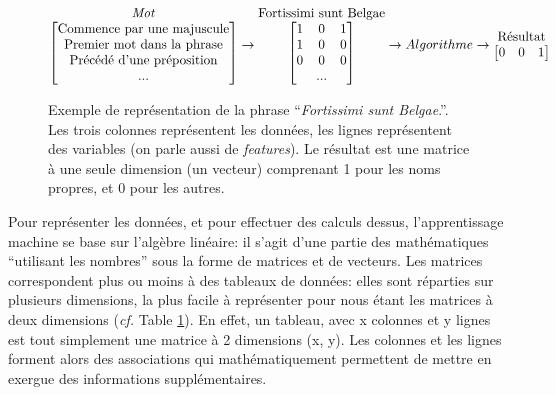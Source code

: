 \begin{figure}[h]
    \centering
    \begin{equation*}
        \begin{matrix}
            \textrm{\textit{Mot}} \\
            \begin{bmatrix}
            \textrm{Commence par une majuscule} \\
            \textrm{Premier mot dans la phrase} \\
            \textrm{Précédé d'une préposition} \\
            \textrm{...} \\
            \end{bmatrix}
        \end{matrix}
        \rightarrow
        \begin{matrix}
            \textrm{Fortissimi sunt Belgae} \\
            \begin{bmatrix}
            1 & 0 & 1 \\
            1 & 0 & 0 \\
            0 & 0 & 0 \\
            & \textrm{...} & \\
            \end{bmatrix}
        \end{matrix}
        \rightarrow Algorithme \rightarrow
        \begin{matrix}
            \textrm{Résultat} \\
            \begin{bmatrix}
            0 & 0 & 1 \\
            \end{bmatrix}
        \end{matrix}
        \end{equation*}
    \caption{Exemple de représentation de la phrase \enquote{\textit{Fortissimi sunt Belgae}.}. Les trois colonnes représentent les données, les lignes représentent des variables (on parle aussi de \textit{features}). Le résultat est une matrice à une seule dimension (un vecteur) comprenant 1 pour les noms propres, et 0 pour les autres.}
    \label{fig:deep-learning:matrice}
\end{figure}

Pour représenter les données, et pour effectuer des calculs dessus, l'apprentissage machine se base sur l'algèbre linéaire: il s'agit d'une partie des mathématiques \enquote{utilisant les nombres} sous la forme de matrices et de vecteurs. Les matrices correspondent plus ou moins à des tableaux de données: elles sont réparties sur plusieurs dimensions, la plus facile à représenter pour nous étant les matrices à deux dimensions (\textit{cf.} Table \ref{fig:deep-learning:matrice}). En effet, un tableau, avec x colonnes et y lignes est tout simplement une matrice à 2 dimensions (x, y). Les colonnes et les lignes forment alors des associations qui mathématiquement permettent de mettre en exergue des informations supplémentaires.

